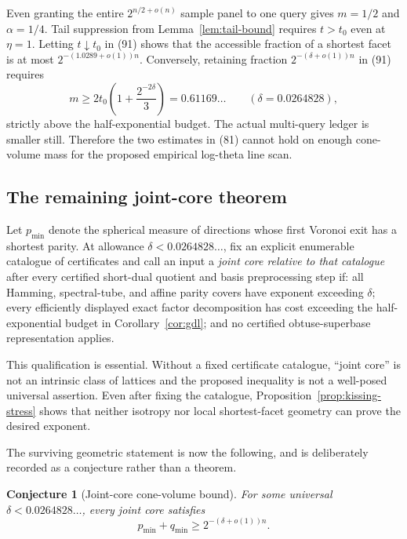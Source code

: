 \documentclass[10pt]{article}
\newtheorem{conjecture}[theorem]{Conjecture}
\theoremstyle{definition}
\begin{document}
Even granting the entire $2^{n/2+o(n)}$ sample panel to one query gives
$m=1/2$ and $\alpha=1/4$.  Tail suppression from Lemma~\ref{lem:tail-bound}
requires $t>t_0$ even at $\eta=1$.  Letting $t\downarrow t_0$ in (91) shows
that the accessible fraction of a shortest facet is at most
$2^{-(1.0289+o(1))n}$.  Conversely, retaining fraction
$2^{-(\delta+o(1))n}$ in (91) requires
\[
 m\ge2t_0\left(1+\frac{2^{-2\delta}}{3}\right)
   =0.61169\ldots\qquad(\delta=0.0264828),                     \tag{92}
\]
strictly above the half-exponential budget.  The actual multi-query ledger
is smaller still.  Therefore the two estimates in (81) cannot hold on
enough cone-volume mass for the proposed empirical log-theta line scan.

\subsection{The remaining joint-core theorem}

Let $p_{\min}$ denote the spherical measure of directions whose first
Voronoi exit has a shortest parity.  At allowance
$\delta<0.0264828\ldots$, fix an explicit enumerable catalogue of
certificates and call an input a \emph{joint core relative to that catalogue}
after every certified short-dual quotient and basis preprocessing step if:
all Hamming, spectral-tube, and affine parity covers have exponent exceeding
$\delta$; every efficiently displayed exact factor decomposition has cost
exceeding the half-exponential budget in Corollary~\ref{cor:gdl}; and no
certified obtuse-superbase representation applies.

This qualification is essential.  Without a fixed certificate catalogue,
``joint core'' is not an intrinsic class of lattices and the proposed
inequality is not a well-posed universal assertion.  Even after fixing the
catalogue, Proposition~\ref{prop:kissing-stress} shows that neither isotropy
nor local shortest-facet geometry can prove the desired exponent.

The surviving geometric statement is now the following, and is deliberately
recorded as a conjecture rather than a theorem.

\begin{conjecture}[Joint-core cone-volume bound]                 \label{conj:joint-core}
For some universal $\delta<0.0264828\ldots$, every joint core satisfies
\[
 p_{\min}+q_{\min}\ge2^{-(\delta+o(1))n}.                      \tag{93}
\]
\end{conjecture}
\end{document}
